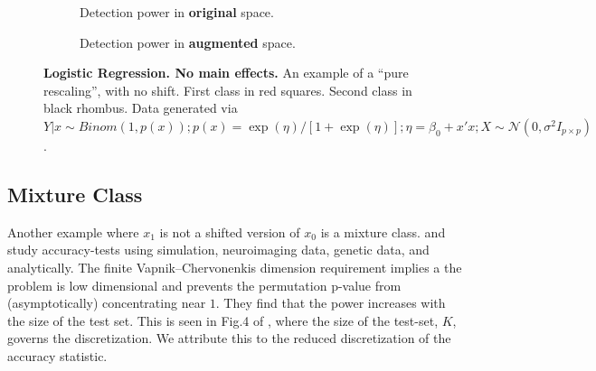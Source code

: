 \documentclass[]{bio}
\begin{document}
\begin{figure}[th]
\begin{subfigure}[t]{.3\columnwidth}
	\caption{Detection power in \textbf{original} space.} 
	\label{fig:logistic-interactions-only-original}
	\end{subfigure}
	\begin{subfigure}[t]{.3\columnwidth}
	\centering
	\caption{Detection power in \textbf{augmented} space.} 
	\label{fig:logistic-interactions-only-augmented}
	\end{subfigure}
	\caption{\textbf{Logistic Regression. No main effects.}
		An example of a ``pure rescaling'', with no shift.
		First class in red squares. Second class in black rhombus.
		Data generated via 
		$Y|x \sim Binom(1,p(x));
		p(x)=\exp(\eta)/[1+\exp(\eta)];
		\eta=\beta_0+x'x; 
		X \sim \mathcal{N}(0,\sigma^2 I_{p\times p})$.
	}
	\label{fig:logistic-interactions-only}
\end{figure}







\subsection{Mixture Class}

Another example where $x_1$ is not a shifted version of $x_0$ is a mixture class. 
\cite{golland_permutation_2003} and \cite{golland_permutation_2005} study accuracy-tests using simulation, neuroimaging data, genetic data, and analytically.
The finite Vapnik–Chervonenkis dimension requirement \cite[Sec 4.3]{golland_permutation_2005} implies a the problem is low dimensional and prevents the permutation p-value from (asymptotically) concentrating near $1$. 
They find that the power increases with the size of the test set.
This is seen in Fig.4 of \cite{golland_permutation_2005}, where the size of the test-set, $K$, governs the discretization. 
We attribute this to the reduced discretization of the accuracy statistic.
\end{document}
